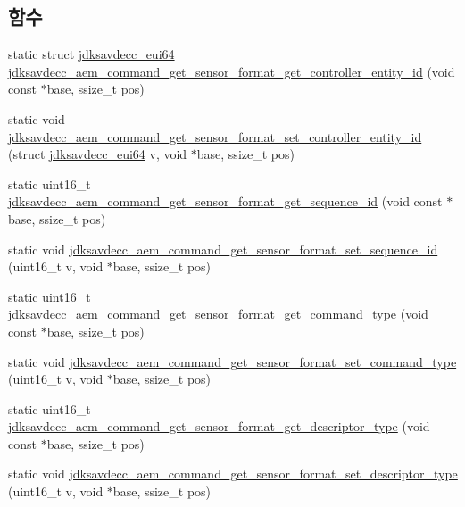 \subsection*{함수}
\begin{DoxyCompactItemize}
\item 
static struct \hyperlink{structjdksavdecc__eui64}{jdksavdecc\+\_\+eui64} \hyperlink{group__command__get__sensor__format_gaaec1dd202801841b55607f599169cb3d}{jdksavdecc\+\_\+aem\+\_\+command\+\_\+get\+\_\+sensor\+\_\+format\+\_\+get\+\_\+controller\+\_\+entity\+\_\+id} (void const $\ast$base, ssize\+\_\+t pos)
\item 
static void \hyperlink{group__command__get__sensor__format_gafc64e0122b2a7397704a8acdf7b35603}{jdksavdecc\+\_\+aem\+\_\+command\+\_\+get\+\_\+sensor\+\_\+format\+\_\+set\+\_\+controller\+\_\+entity\+\_\+id} (struct \hyperlink{structjdksavdecc__eui64}{jdksavdecc\+\_\+eui64} v, void $\ast$base, ssize\+\_\+t pos)
\item 
static uint16\+\_\+t \hyperlink{group__command__get__sensor__format_gad6ea56469508ddf9602299ee152d119b}{jdksavdecc\+\_\+aem\+\_\+command\+\_\+get\+\_\+sensor\+\_\+format\+\_\+get\+\_\+sequence\+\_\+id} (void const $\ast$base, ssize\+\_\+t pos)
\item 
static void \hyperlink{group__command__get__sensor__format_ga84296011ccf323070a8d5be9c10f62df}{jdksavdecc\+\_\+aem\+\_\+command\+\_\+get\+\_\+sensor\+\_\+format\+\_\+set\+\_\+sequence\+\_\+id} (uint16\+\_\+t v, void $\ast$base, ssize\+\_\+t pos)
\item 
static uint16\+\_\+t \hyperlink{group__command__get__sensor__format_ga8a5b2655a33e1ffb524621fb280c02bd}{jdksavdecc\+\_\+aem\+\_\+command\+\_\+get\+\_\+sensor\+\_\+format\+\_\+get\+\_\+command\+\_\+type} (void const $\ast$base, ssize\+\_\+t pos)
\item 
static void \hyperlink{group__command__get__sensor__format_gaad47b8e505c110044de8fecfe7ba86bc}{jdksavdecc\+\_\+aem\+\_\+command\+\_\+get\+\_\+sensor\+\_\+format\+\_\+set\+\_\+command\+\_\+type} (uint16\+\_\+t v, void $\ast$base, ssize\+\_\+t pos)
\item 
static uint16\+\_\+t \hyperlink{group__command__get__sensor__format_ga5b07e8f7b3995045a63f28a35753b14d}{jdksavdecc\+\_\+aem\+\_\+command\+\_\+get\+\_\+sensor\+\_\+format\+\_\+get\+\_\+descriptor\+\_\+type} (void const $\ast$base, ssize\+\_\+t pos)
\item 
static void \hyperlink{group__command__get__sensor__format_ga956a032afeec8d35ba6aae053a80b189}{jdksavdecc\+\_\+aem\+\_\+command\+\_\+get\+\_\+sensor\+\_\+format\+\_\+set\+\_\+descriptor\+\_\+type} (uint16\+\_\+t v, void $\ast$base, ssize\+\_\+t pos)

\end{DoxyCompactItemize}
